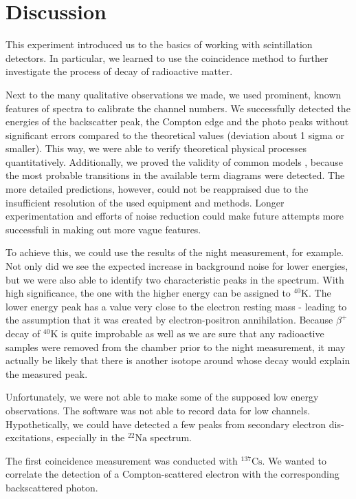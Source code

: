 \section{Discussion}
%
This experiment introduced us to the basics of working with scintillation detectors.
In particular, we learned to use the coincidence method to further investigate the process of decay of radioactive matter.
%
\par
%
Next to the many qualitative observations we made, we used prominent, known features of spectra to calibrate the channel numbers.
We successfully detected the energies of the backscatter peak, the Compton edge and the photo peaks without significant errors compared to the theoretical values (deviation about 1 sigma or smaller).
This way, we were able to verify theoretical physical processes quantitatively.
Additionally, we proved the validity of common models 
, because the most probable transitions in the available term diagrams were detected.
The more detailed predictions, however, could not be reappraised due to the insufficient resolution of the used equipment and methods.
Longer experimentation and efforts of noise reduction could make future attempts more successfuli in making out more vague features.
%
\par
%
To achieve this, we could use the results of the night measurement, for example.
Not only did we see the expected increase in background noise for lower energies, but we were also able to identify two characteristic peaks in the spectrum.
With high significance, the one with the higher energy can be assigned to $^{40}\text{K}$.
The lower energy peak has a value very close to the electron resting mass - leading to the assumption that it was created by electron-positron annihilation.
Because $\beta^{+}$ decay of $^{40}\text{K}$ is quite improbable \cite{WikiPotassium} as well as we are sure that any radioactive samples were removed from the chamber prior to the night measurement, it may actually be likely that there is another isotope around whose decay would explain the measured peak.
%
\par
%
Unfortunately, we were not able to make some of the supposed low energy observations.
The software was not able to record data for low channels.
Hypothetically, we could have detected a few peaks from secondary electron dis-excitations, especially in the $^{22}\text{Na}$ spectrum.
%
\par
%
The first coincidence measurement was conducted with $^{137}\text{Cs}$.
We wanted to correlate the detection of a Compton-scattered electron with the corresponding backscattered photon.
